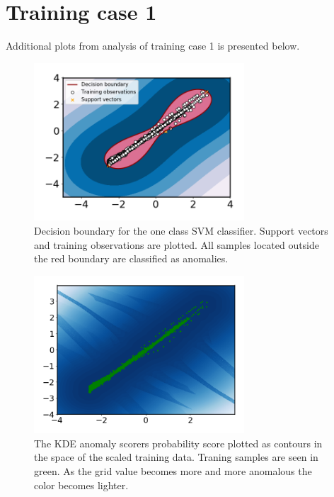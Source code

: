 \chapter{Training case 1}\label{appendix:training_case1}
    Additional plots from analysis of training case 1 is presented below. 
    \begin{figure}
        \centering
        \includegraphics[width=0.7\textwidth]{report/figures/analysis/plant1_training/svm_boundary.png}
        \caption{Decision boundary for the one class SVM classifier. Support vectors and training observations are plotted. All samples located outside the red boundary are classified as anomalies.}
        \label{fig:svm_train_p1_boundary}
    \end{figure}
    
    
     \begin{figure}
        \centering
        \includegraphics[width=0.7\textwidth]{report/figures/analysis/plant1_training/kde_boundary.png}
        \caption{The KDE anomaly scorers probability score plotted as contours in the space of the scaled training data. Traning samples are seen in green. As the grid value becomes more and more anomalous the color becomes lighter.}
        \label{fig:my_label}
    \end{figure}
    
